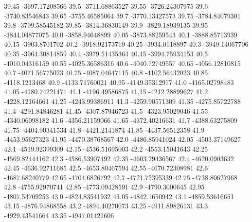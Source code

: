           39.45   -3697.17208566
           39.5   -3711.68863527
          39.55   -3726.24307975
           39.6   -3740.83546843
          39.65   -3755.46585064
           39.7   -3770.13427573
          39.75   -3784.84079301
           39.8   -3799.58545182
          39.85   -3814.36830149
           39.9   -3829.18939135
          39.95   -3844.04877075
           40.0   -3858.94648899
          40.05   -3873.88259543
           40.1   -3888.85713939
          40.15    -3903.8701702
           40.2   -3918.92173719
          40.25    -3934.0118897
           40.3   -3949.14067706
          40.35   -3964.30814859
           40.4   -3979.51435364
          40.45   -3994.75934153
           40.5   -4010.04316159
          40.55   -4025.36586316
           40.6   -4040.72749557
          40.65   -4056.12810815
           40.7   -4071.56775023
          40.75   -4087.04647115
           40.8   -4102.56432023
          40.85    -4118.1213468
           40.9   -4133.71760021
          40.95   -4149.35312977
           41.0   -4165.02798483
          41.05   -4180.74221471
           41.1   -4196.49586875
          41.15   -4212.28899627
           41.2   -4228.12164661
          41.25   -4243.99386911
           41.3   -4259.90571309
          41.35   -4275.85722788
           41.4   -4291.84846281
          41.45   -4307.87946723
           41.5   -4323.95029046
          41.55   -4340.06098182
           41.6   -4356.21159066
          41.65   -4372.40216631
           41.7   -4388.63275809
          41.75   -4404.90341534
           41.8    -4421.2141874
          41.85   -4437.56512358
           41.9   -4453.95627323
          41.95   -4470.38768567
           42.0   -4486.85941024
          42.05   -4503.37149627
           42.1   -4519.92399309
          42.15   -4536.51695003
           42.2   -4553.15041643
          42.25   -4569.82444162
           42.3   -4586.53907492
          42.35   -4603.29436567
           42.4    -4620.0903632
          42.45   -4636.92711685
           42.5   -4653.80467594
          42.55   -4670.72308981
           42.6   -4687.68240779
          42.65    -4704.6826792
           42.7   -4721.72395339
          42.75   -4738.80627968
           42.8   -4755.92970741
          42.85   -4773.09428591
           42.9    -4790.3000645
          42.95   -4807.54709253
           43.0   -4824.83541932
          43.05    -4842.1650942
           43.1   -4859.53616651
          43.15   -4876.94868558
           43.2   -4894.40270073
          43.25   -4911.89826131
           43.3   -4929.43541664
          43.35   -4947.01421606
